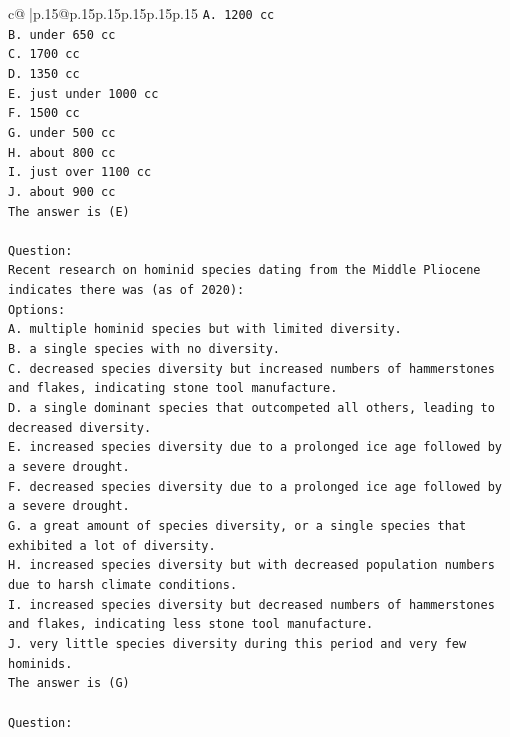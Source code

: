 \documentclass{article}
\begin{document}
{\begin{supertabular}{c@{$\;$}|p{.15\linewidth}@{}p{.15\linewidth}p{.15\linewidth}p{.15\linewidth}p{.15\linewidth}p{.15\linewidth}}
{{{\texttt{A. 1200 cc} \\
\texttt{B. under 650 cc} \\
\texttt{C. 1700 cc} \\
\texttt{D. 1350 cc} \\
\texttt{E. just under 1000 cc} \\
\texttt{F. 1500 cc} \\
\texttt{G. under 500 cc} \\
\texttt{H. about 800 cc} \\
\texttt{I. just over 1100 cc} \\
\texttt{J. about 900 cc} \\
\texttt{The answer is (E)} \\
\\ 
\texttt{Question:} \\
\texttt{Recent research on hominid species dating from the Middle Pliocene indicates there was (as of 2020):} \\
\texttt{Options:} \\
\texttt{A. multiple hominid species but with limited diversity.} \\
\texttt{B. a single species with no diversity.} \\
\texttt{C. decreased species diversity but increased numbers of hammerstones and flakes, indicating stone tool manufacture.} \\
\texttt{D. a single dominant species that outcompeted all others, leading to decreased diversity.} \\
\texttt{E. increased species diversity due to a prolonged ice age followed by a severe drought.} \\
\texttt{F. decreased species diversity due to a prolonged ice age followed by a severe drought.} \\
\texttt{G. a great amount of species diversity, or a single species that exhibited a lot of diversity.} \\
\texttt{H. increased species diversity but with decreased population numbers due to harsh climate conditions.} \\
\texttt{I. increased species diversity but decreased numbers of hammerstones and flakes, indicating less stone tool manufacture.} \\
\texttt{J. very little species diversity during this period and very few hominids.} \\
\texttt{The answer is (G)} \\
\\ 
\texttt{Question:} \\
}}}
\end{supertabular}}
\end{document}
